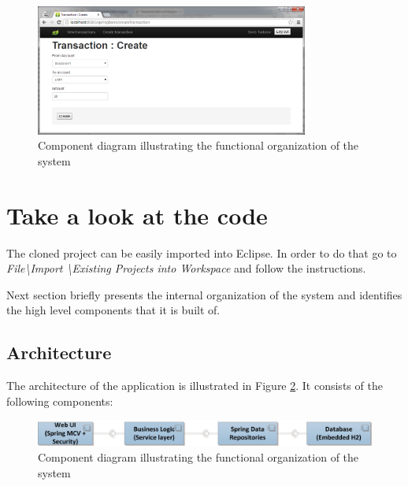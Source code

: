 \documentclass[a4paper, notitlepage]{article}
\begin{document}
\begin{figure}[H]
  \centering
    \includegraphics[width=0.8\textwidth]{new_Screen.png}
    \caption{Component diagram illustrating the functional organization of the system}
    \label{new}
\end{figure}

\section{Take a look at the code}
The cloned project can be easily imported into Eclipse. In order to do that go to \textit{File\textbackslash Import \textbackslash Existing Projects into Workspace} and follow the instructions.

Next section briefly presents the internal organization of the system and identifies the high level components that it is built of. 

\subsection{Architecture}

The architecture of the application is illustrated in Figure \ref{org}. It consists of the following components:
\bigskip

\begin{figure}[H]
  \centering
    \includegraphics[width=1.3\textwidth]{high_level.jpg}
    \caption{Component diagram illustrating the functional organization of the system}
    \label{org}
\end{figure}
\end{document}
